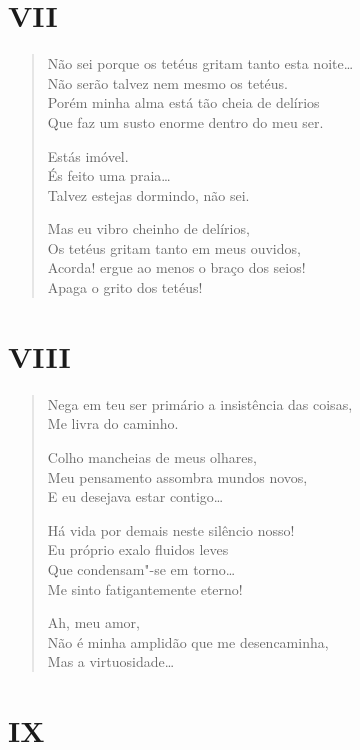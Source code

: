 \pagebreak
\section*{VII}

\begin{verse}
Não sei porque os tetéus gritam tanto esta noite\ldots{}\\
Não serão talvez nem mesmo os tetéus.\\
Porém minha alma está tão cheia de delírios\\
Que faz um susto enorme dentro do meu ser.

Estás imóvel.\\
És feito uma praia\ldots{}\\
Talvez estejas dormindo, não sei.

Mas eu vibro cheinho de delírios,\\
Os tetéus gritam tanto em meus ouvidos,\\
Acorda! ergue ao menos o braço dos seios!\\
Apaga o grito dos tetéus!
\end{verse}

\pagebreak
\section*{VIII}

\begin{verse}
Nega em teu ser primário a insistência das coisas,\\
Me livra do caminho.

Colho mancheias de meus olhares,\\
Meu pensamento assombra mundos novos,\\
E eu desejava estar contigo\ldots{}

Há vida por demais neste silêncio nosso!\\
Eu próprio exalo fluidos leves\\
Que condensam"-se em torno\ldots{}\\
Me sinto fatigantemente eterno!

Ah, meu amor,\\
Não é minha amplidão que me desencaminha,\\
Mas a virtuosidade\ldots{}
\end{verse}

\pagebreak
\section*{IX}

